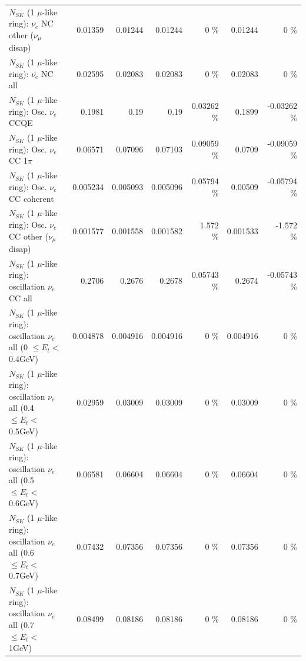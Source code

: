 \begin{table}
\begin{tabular}{| l | r | r | r  r | r  r |}
          $N_{SK}$ (1 $\mu$-like ring): $\bar{\nu_e}$ NC other ($\nu_\mu$ disap) &         0.01359 &         0.01244 &         0.01244 &        0 \%  &         0.01244 &        0 \%  \\ 
                            $N_{SK}$ (1 $\mu$-like ring): $\bar{\nu_{e}}$ NC all &         0.02595 &         0.02083 &         0.02083 &        0 \%  &         0.02083 &        0 \%  \\ 
\hline
\hline
\hline
                                 $N_{SK}$ (1 $\mu$-like ring): Osc. $\nu_e$ CCQE &          0.1981 &            0.19 &            0.19 &  0.03262 \%  &          0.1899 & -0.03262 \%  \\ 
                            $N_{SK}$ (1 $\mu$-like ring): Osc. $\nu_e$ CC 1$\pi$ &         0.06571 &         0.07096 &         0.07103 &  0.09059 \%  &          0.0709 & -0.09059 \%  \\ 
                          $N_{SK}$ (1 $\mu$-like ring): Osc. $\nu_e$ CC coherent &        0.005234 &        0.005093 &        0.005096 &  0.05794 \%  &         0.00509 & -0.05794 \%  \\ 
           $N_{SK}$ (1 $\mu$-like ring): Osc. $\nu_e$ CC other ($\nu_\mu$ disap) &        0.001577 &        0.001558 &        0.001582 &    1.572 \%  &        0.001533 &   -1.572 \%  \\ 
                        $N_{SK}$ (1 $\mu$-like ring): oscillation $\nu_e$ CC all &          0.2706 &          0.2676 &          0.2678 &  0.05743 \%  &          0.2674 & -0.05743 \%  \\ 
\hline
$N_{SK}$ (1 $\mu$-like ring): oscillation $\nu_{e}$ all (0 $\leq E_{t} <$ 0.4GeV) &        0.004878 &        0.004916 &        0.004916 &        0 \%  &        0.004916 &        0 \%  \\ 
$N_{SK}$ (1 $\mu$-like ring): oscillation $\nu_{e}$ all (0.4 $\leq E_{t} <$ 0.5GeV) &         0.02959 &         0.03009 &         0.03009 &        0 \%  &         0.03009 &        0 \%  \\ 
$N_{SK}$ (1 $\mu$-like ring): oscillation $\nu_{e}$ all (0.5 $\leq E_{t} <$ 0.6GeV) &         0.06581 &         0.06604 &         0.06604 &        0 \%  &         0.06604 &        0 \%  \\ 
$N_{SK}$ (1 $\mu$-like ring): oscillation $\nu_{e}$ all (0.6 $\leq E_{t} <$ 0.7GeV) &         0.07432 &         0.07356 &         0.07356 &        0 \%  &         0.07356 &        0 \%  \\ 
$N_{SK}$ (1 $\mu$-like ring): oscillation $\nu_{e}$ all (0.7 $\leq E_{t} <$ 1GeV) &         0.08499 &         0.08186 &         0.08186 &        0 \%  &         0.08186 &        0 \%  \\ 

\end{tabular}
\end{table}
